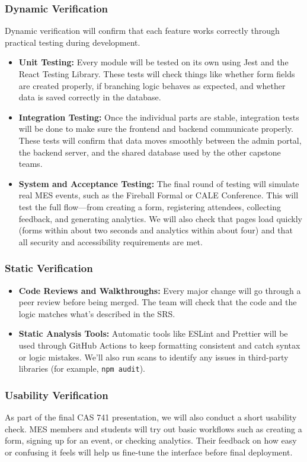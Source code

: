 \documentclass[12pt, titlepage]{article}
\begin{document}
\subsubsection*{Dynamic Verification}
Dynamic verification will confirm that each feature works correctly through practical testing during development.

\begin{itemize}
  \item \textbf{Unit Testing:} Every module will be tested on its own using Jest and the React Testing Library. These tests will check things like whether form fields are created properly, if branching logic behaves as expected, and whether data is saved correctly in the database.
  \item \textbf{Integration Testing:} Once the individual parts are stable, integration tests will be done to make sure the frontend and backend communicate properly. These tests will confirm that data moves smoothly between the admin portal, the backend server, and the shared database used by the other capstone teams.
  \item \textbf{System and Acceptance Testing:} The final round of testing will simulate real MES events, such as the Fireball Formal or CALE Conference. This will test the full flow—from creating a form, registering attendees, collecting feedback, and generating analytics. We will also check that pages load quickly (forms within about two seconds and analytics within about four) and that all security and accessibility requirements are met.
\end{itemize}

\subsubsection*{Static Verification}
\begin{itemize}
  \item \textbf{Code Reviews and Walkthroughs:} Every major change will go through a peer review before being merged. The team will check that the code and the logic matches what’s described in the SRS.
  \item \textbf{Static Analysis Tools:} Automatic tools like ESLint and Prettier will be used through GitHub Actions to keep formatting consistent and catch syntax or logic mistakes. We’ll also run scans to identify any issues in third-party libraries (for example, \texttt{npm audit}).
\end{itemize}

\subsubsection*{Usability Verification}
As part of the final CAS 741 presentation, we will also conduct a short usability check. MES members and students will try out basic workflows such as creating a form, signing up for an event, or checking analytics. Their feedback on how easy or confusing it feels will help us fine-tune the interface before final deployment.
\end{document}

